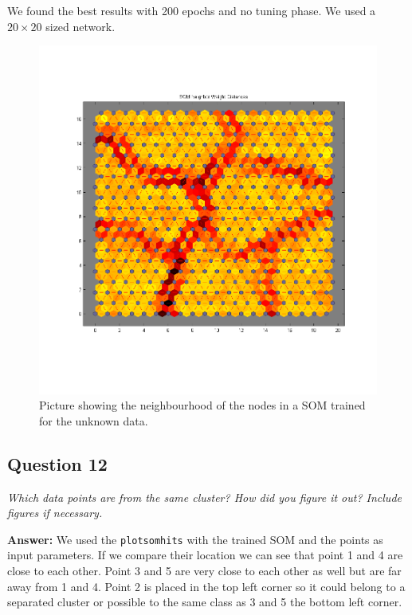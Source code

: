 \documentclass[a4paper]{article}
\begin{document}
We found the best results with 200 epochs and no tuning phase. We used a $20 \times 20$ sized network.

 \begin{figure}[H] %
	 \includegraphics[scale=0.4]{20x20trainedUnknown.png}
	 \caption{\label{fig:20x20trainedUnknown} Picture showing the neighbourhood of the nodes in a SOM trained for the unknown data.}
 \end{figure}

\subsection*{Question 12}
\emph{Which data points are from the same cluster? How did you
figure it out? Include figures if necessary.} 

\textbf{Answer:} We used the \texttt{plotsomhits} with the trained SOM and the points as input parameters. If we compare their location we can see that point 1 and 4 are close to each other. Point 3 and 5 are very close to each other as well but are far away from 1 and 4. Point 2 is placed in the top left corner so it could belong to a separated cluster or possible to the same class as 3 and 5 the bottom left corner.
\end{document}
